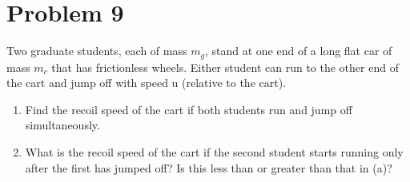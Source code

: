 \documentclass{article}
\begin{document}
\section*{Problem 9} 
Two graduate students, each of mass $m_g$, stand at one end of a long flat car of mass $m_c$ that has frictionless wheels. Either student can run to the other end of the cart and jump off with speed u (relative to the cart).
\begin{enumerate}[label=\alph*)]
	\item %
	Find the recoil speed of the cart if both students run and jump off simultaneously.
	\item %
	What is the recoil speed of the cart if the second student starts running only after the first has jumped off? Is this less than or greater than that in (a)?
\end{enumerate}
\end{document}

